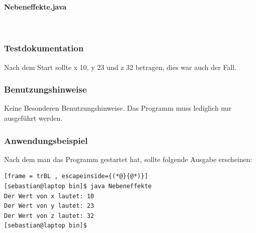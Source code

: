 \paragraph{Nebeneffekte.java}\


\subsubsection{Testdokumentation}
Nach dem Start sollte x 10, y 23 und z 32 betragen, dies war auch der Fall.

\subsubsection{Benutzungshinweise}
Keine Besonderen Benutzungshinweise.
Das Programm muss lediglich nur ausgeführt werden.

\subsubsection{Anwendungsbeispiel}
Nach dem man das Programm gestartet hat, sollte folgende Ausgabe erscheinen:
\begin{lstlisting}[frame = trBL , escapeinside={(*@}{@*)}]
[sebastian@laptop bin]$ java Nebeneffekte 
Der Wert von x lautet: 10
Der Wert von y lautet: 23
Der Wert von z lautet: 32
[sebastian@laptop bin]$ 
\end{lstlisting}
